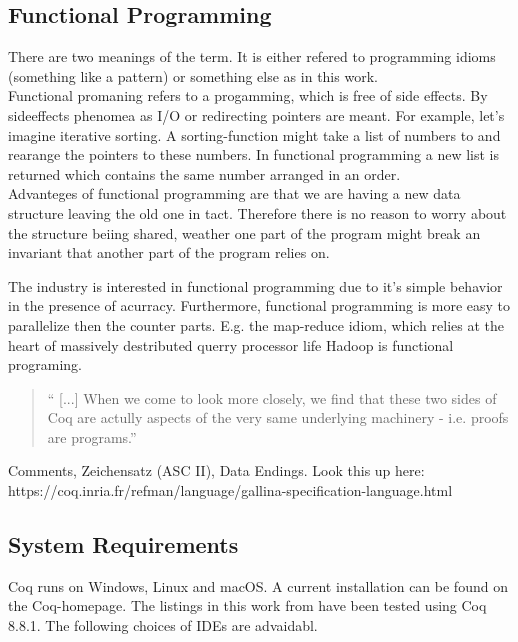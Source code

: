 \subsection{Functional Programming}
There are two meanings of the term. 
It is either refered to programming idioms (something like a pattern) or something else as in this work.\\

Functional promaning refers to a progamming, which is free of side effects.
By sideeffects phenomea as I/O or redirecting pointers are meant. 
For example, let's imagine iterative sorting. 
A sorting-function might take a list of numbers to and rearange the pointers to these numbers.
In functional programming a new list is returned which contains the same number arranged in an order.\\ 
Advanteges of functional programming are  that we are having a new data structure leaving the old one in tact. 
Therefore there is no reason to worry about the structure beiing shared, weather one part of the program might break an invariant that another part of the program relies on.\par
The industry is interested in functional programming due to it's simple behavior in the presence of acurracy.
Furthermore, functional programming is more easy to parallelize then the counter parts.
E.g. the map-reduce idiom, which relies at the heart of massively destributed querry processor life \gls{Hadoop} is functional programing. 

\begin{quote}
`` [...] When we come to look more closely, we find that these two sides of Coq are actully aspects of the very same underlying machinery - i.e. proofs are programs.'' 
\end{quote}



Comments, Zeichensatz (ASC II), Data Endings.
Look this up here:\\
https://coq.inria.fr/refman/language/gallina-specification-language.html




\subsection{System Requirements}

Coq runs on Windows, Linux and macOS.
A current installation can be found on the Coq-homepage. 
The listings in this work from \cite{PACGGHSY} have been tested using Coq 8.8.1.
The following choices of IDEs are advaidabl. 

